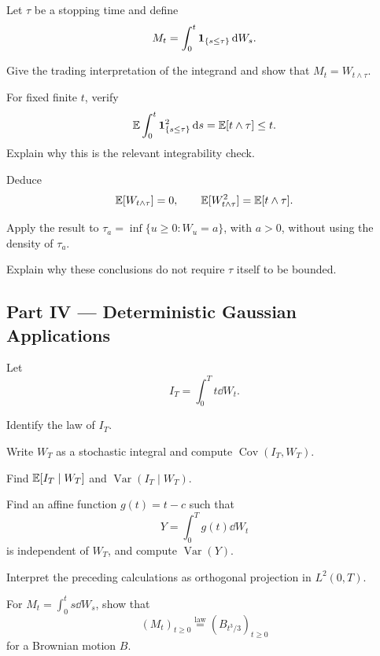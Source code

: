 \begin{exercise}
Let \(\tau\) be a stopping time and define
\[
M_t=\int_0^t\mathbf{1}_{\{s\leq\tau\}}\,\mathrm{d} W_s.
\]
\begin{exparts}
  \item Give the trading interpretation of the integrand and show that
  \(M_t=W_{t\wedge\tau}\).
  \item For fixed finite \(t\), verify
  \[
  \mathbb{E}\int_0^t\mathbf{1}_{\{s\leq\tau\}}^2\,\mathrm{d} s
  =\mathbb{E}[t\wedge\tau]\leq t.
  \]
  Explain why this is the relevant integrability check.
  \item Deduce
  \[
  \mathbb{E}[W_{t\wedge\tau}]=0,
  \qquad
  \mathbb{E}[W_{t\wedge\tau}^2]=\mathbb{E}[t\wedge\tau].
  \]
  \item Apply the result to
  \(\tau_a=\inf\{u\geq0:W_u=a\}\), with \(a>0\), without using the
  density of \(\tau_a\).
  \item Explain why these conclusions do not require \(\tau\) itself to be
  bounded.
\end{exparts}
\end{exercise}

\subsection*{Part IV --- Deterministic Gaussian Applications}

\begin{exercise}
Let
\[
I_T=\int_0^Tt\dd W_t.
\]
\begin{exparts}
  \item Identify the law of \(I_T\).
  \item Write \(W_T\) as a stochastic integral and compute
  \(\operatorname{Cov}(I_T,W_T)\).
  \item Find \(\mathbb{E}[I_T\mid W_T]\) and
  \(\operatorname{Var}(I_T\mid W_T)\).
  \item Find an affine function \(g(t)=t-c\) such that
  \[
  Y=\int_0^Tg(t)\dd W_t
  \]
  is independent of \(W_T\), and compute \(\operatorname{Var}(Y)\).
  \item Interpret the preceding calculations as orthogonal projection in
  \(L^2(0,T)\).
  \item For \(M_t=\int_0^ts\dd W_s\), show that
  \[
  (M_t)_{t\geq0}\overset{\mathrm{law}}=
  (B_{t^3/3})_{t\geq0}
  \]
  for a Brownian motion \(B\).
\end{exparts}
\end{exercise}

